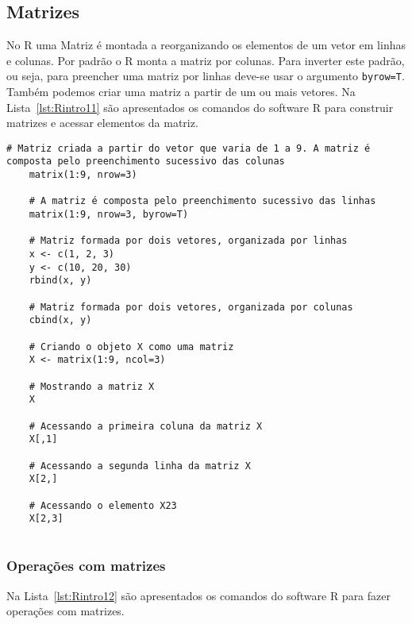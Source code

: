 \documentclass[11pt,fleqn]{book} %
\begin{document}
\vspace{0.5cm}


\subsection{Matrizes}

No R uma Matriz é montada a reorganizando os elementos de um vetor em linhas e colunas. Por padrão o R monta a matriz por colunas. Para inverter este padrão, ou seja, para preencher uma matriz por linhas deve-se usar o argumento \texttt{byrow=T}. Também podemos criar uma matriz a partir de um ou mais vetores. Na Lista~\ref{lst:Rintro11} são apresentados os comandos do software R para construir matrizes e acessar elementos da matriz. \\

\begin{scriptsize}
	\estiloR
	\begin{lstlisting}[caption={Comandos do software R}, label=lst:Rintro11]
	# Matriz criada a partir do vetor que varia de 1 a 9. A matriz é composta pelo preenchimento sucessivo das colunas
	matrix(1:9, nrow=3)
	
	# A matriz é composta pelo preenchimento sucessivo das linhas
	matrix(1:9, nrow=3, byrow=T)
	
	# Matriz formada por dois vetores, organizada por linhas	
	x <- c(1, 2, 3)
	y <- c(10, 20, 30)
	rbind(x, y)
	
	# Matriz formada por dois vetores, organizada por colunas
	cbind(x, y)	
	
	# Criando o objeto X como uma matriz
	X <- matrix(1:9, ncol=3)
	
	# Mostrando a matriz X
	X
	
	# Acessando a primeira coluna da matriz X
	X[,1]
	
	# Acessando a segunda linha da matriz X
	X[2,]
	
	# Acessando o elemento X23
	X[2,3]
	
	\end{lstlisting}
\end{scriptsize}


\subsubsection{Operações com matrizes}

Na Lista~\ref{lst:Rintro12} são apresentados os comandos do software R para fazer operações com matrizes. \\
\end{document}
